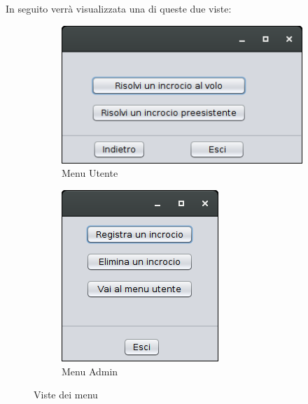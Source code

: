 In seguito verrà visualizzata una di queste due viste:
\begin{figure}[!htb]
	\centering
	\begin{subfigure}[b]{.4\textwidth}
		\includegraphics[width=\textwidth]{images/user_gui.png}
		\caption{Menu Utente}
	\end{subfigure}
	\begin{subfigure}[b]{.4\textwidth}
		\includegraphics[width=\textwidth]{images/admin_gui.png}
		\caption{Menu Admin}
	\end{subfigure}
	\caption{Viste dei menu}
\end{figure}

